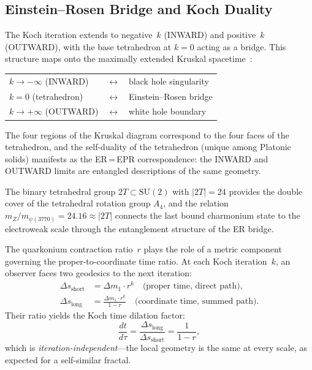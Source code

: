 \documentclass[twocolumn,showpacs,preprintnumbers,amsmath,amssymb,prl]{revtex4-2}
\begin{document}
\subsection{Einstein--Rosen Bridge and Koch Duality}

The Koch iteration extends to negative~$k$ (INWARD) and positive~$k$ (OUTWARD),
with the base tetrahedron at $k=0$ acting as a bridge.
This structure maps onto the maximally extended Kruskal
spacetime~\cite{MaldacenaSusskind}:
\begin{center}
\begin{tabular}{lcl}
$k \to -\infty$ (INWARD)  & $\longleftrightarrow$ & black hole singularity \\
$k = 0$ (tetrahedron)     & $\longleftrightarrow$ & Einstein--Rosen bridge \\
$k \to +\infty$ (OUTWARD) & $\longleftrightarrow$ & white hole boundary \\
\end{tabular}
\end{center}
The four regions of the Kruskal diagram correspond to the four faces
of the tetrahedron, and the self-duality of the tetrahedron
(unique among Platonic solids) manifests as the ER\,=\,EPR correspondence:
the INWARD and OUTWARD limits are entangled descriptions of the same geometry.

The binary tetrahedral group $2T \subset \text{SU}(2)$ with $|2T| = 24$
provides the double cover of the tetrahedral rotation group $A_4$, and the
relation $m_Z / m_{\psi(3770)} = 24.16 \approx |2T|$ connects the
last bound charmonium state to the electroweak scale through the
entanglement structure of the ER bridge.

The quarkonium contraction ratio~$r$ plays the role of a metric component
governing the proper-to-coordinate time ratio. At each Koch iteration~$k$,
an observer faces two geodesics to the next iteration:
\begin{align}
    \Delta s_{\text{short}} &= \Delta m_1 \cdot r^k
        \quad \text{(proper time, direct path)}, \\
    \Delta s_{\text{long}}  &= \frac{\Delta m_1 \cdot r^k}{1-r}
        \quad \text{(coordinate time, summed path)}.
\end{align}
Their ratio yields the Koch time dilation factor:
\begin{equation}
    \frac{dt}{d\tau} = \frac{\Delta s_{\text{long}}}{\Delta s_{\text{short}}}
    = \frac{1}{1-r},
    \label{eq:timedilation}
\end{equation}
which is \emph{iteration-independent}---the local geometry is the same
at every scale, as expected for a self-similar fractal.
\end{document}

